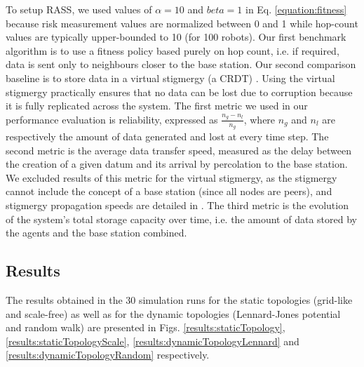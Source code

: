 \documentclass[sigconf]{aamas}
\begin{document}
To setup RASS, we used values of $\alpha = 10$ and $beta = 1$ in Eq. \ref{equation:fitness} because risk measurement values are normalized between 0 and 1 while hop-count values are typically upper-bounded to 10 (for 100 robots). Our first benchmark algorithm is to use a fitness policy based purely on hop count, i.e. if required, data is sent only to neighbours closer to the base station. Our second comparison baseline is to store data in a virtual stigmergy (a CRDT) \cite{pinciroliTuple2016}. Using the virtual stigmergy practically ensures that no data can be lost due to corruption because it is fully replicated across the system. The first metric we used in our performance evaluation is reliability, expressed as $\frac{n_g - n_l}{n_g}$, where $n_g$ and $n_l$ are respectively the amount of data generated and lost at every time step. The second metric is the average data transfer speed, measured as the delay between the creation of a given datum and its arrival by percolation to the base station. We excluded results of this metric for the virtual stigmergy, as the stigmergy cannot include the concept of a base station (since all nodes are peers), and stigmergy propagation speeds are detailed in \cite{pinciroliTuple2016}. The third metric is the evolution of the system's total storage capacity over time, i.e. the amount of data stored by the agents and the base station combined.


\subsection{Results}

The results obtained in the 30 simulation runs for the static topologies (grid-like and scale-free) as well as for the dynamic topologies (Lennard-Jones potential and random walk) are presented in Figs. \ref{results:staticTopology}, \ref{results:staticTopologyScale}, \ref{results:dynamicTopologyLennard} and  \ref{results:dynamicTopologyRandom} respectively.
\end{document}
